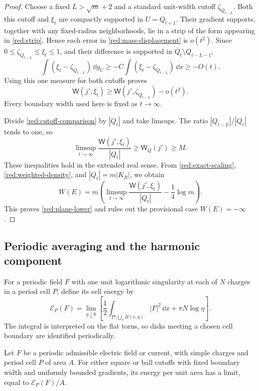 \begin{proof}
Choose a fixed $L>\sqrt m+2$ and a standard unit-width cutoff
$\zeta_{Q_{t-L}}$.  Both this cutoff and $\xi_t$ are compactly
supported in $U=Q_{t+1}$.  Their gradient supports, together with
any fixed-radius neighborhoods, lie in a strip of the form appearing
in \eqref{red:strip}.  Hence each error in
\eqref{red:mass-displacement} is $o(t^2)$.
Since $0\le\zeta_{Q_{t-L}}\le\xi_t\le1$, and their difference is
supported in $\overline Q_t\setminus Q_{t-L-1}$,
\[
 \int(\xi_t-\zeta_{Q_{t-L}})\,\dd g_U
 \ge-C\int(\xi_t-\zeta_{Q_{t-L}})\,\dd x\ge-O(t).
\]
Using this one measure for both cutoffs proves
\begin{equation}\label{red:cutoff-comparison}
 \mathsf W(j',\xi_t)
 \ge\mathsf W(j',\zeta_{Q_{t-L}})-o(t^2).
\end{equation}
Every boundary width used here is fixed as $t\to\infty$.

Divide \eqref{red:cutoff-comparison} by $|Q_t|$ and take limsups.
The ratio $|Q_{t-L}|/|Q_t|$ tends to one, so
\[
 \limsup_{t\to\infty}\frac{\mathsf W(j',\xi_t)}{|Q_t|}
 \ge\mathsf W_Q(j')\ge M.
\]
These inequalities hold in the extended real sense.  From
\eqref{red:exact-scaling}, \eqref{red:weighted-density}, and
$|Q_t|=m|K_R|$, we obtain
\[
 W(E)=m\left(\limsup_{t\to\infty}
                \frac{\mathsf W(j',\xi_t)}{|Q_t|}
                         -\frac14\log m\right).
\]
This proves \eqref{red:plane-lower} and rules out the provisional
case $W(E)=-\infty$.
\end{proof}

\subsection{Periodic averaging and the harmonic component}

For a periodic field $F$ with one unit logarithmic singularity at
each of $N$ charges in a period cell $P$, define its cell energy by
\[
 \mathcal E_P(F)=\lim_{\eta\downarrow0}
 \left[\frac12\int_{P\setminus\bigcup_v B(v,\eta)}|F|^2\,\dd x
                         +\pi N\log\eta\right].
\]
The integral is interpreted on the flat torus, so disks meeting a
chosen cell boundary are identified periodically.

\begin{lemma}\label{red:periodic-average}
Let $F$ be a periodic admissible electric field or current, with
simple charges and period cell $P$ of area $A$.  For either square
or ball cutoffs with fixed boundary width and uniformly bounded
gradients, its energy per unit area has a limit, equal to
$\mathcal E_P(F)/A$.
\end{lemma}

